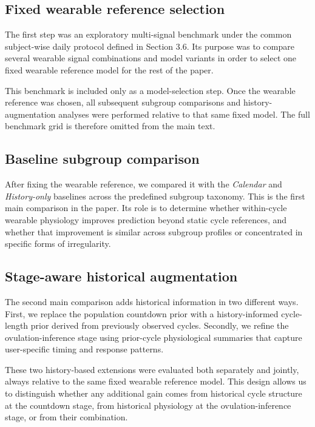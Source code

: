 \documentclass[conference]{IEEEtran}
\begin{document}
\subsection{Fixed wearable reference selection}

The first step was an exploratory multi-signal benchmark under the common subject-wise daily protocol defined in Section 3.6. Its purpose was to compare several wearable signal combinations and model variants in order to select one fixed wearable reference model for the rest of the paper.

This benchmark is included only as a model-selection step. Once the wearable reference was chosen, all subsequent subgroup comparisons and history-augmentation analyses were performed relative to that same fixed model. The full benchmark grid is therefore omitted from the main text.

\subsection{Baseline subgroup comparison}

After fixing the wearable reference, we compared it with the \textit{Calendar} and \textit{History-only} baselines across the predefined subgroup taxonomy. This is the first main comparison in the paper. Its role is to determine whether within-cycle wearable physiology improves prediction beyond static cycle references, and whether that improvement is similar across subgroup profiles or concentrated in specific forms of irregularity.

\subsection{Stage-aware historical augmentation}

The second main comparison adds historical information in two different ways. First, we replace the population countdown prior with a history-informed cycle-length prior derived from previously observed cycles. Secondly, we refine the ovulation-inference stage using prior-cycle physiological summaries that capture user-specific timing and response patterns.

These two history-based extensions were evaluated both separately and jointly, always relative to the same fixed wearable reference model. This design allows us to distinguish whether any additional gain comes from historical cycle structure at the countdown stage, from historical physiology at the ovulation-inference stage, or from their combination.
\end{document}

